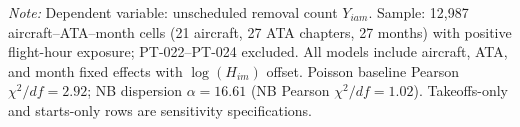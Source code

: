 \begin{table}[htbp]
\centering
\caption{Negative Binomial panel model incidence rate ratios for unscheduled removal demand (R-3).}
\label{tab:r3-nb-panel}
\small
\setlength{\tabcolsep}{4pt}
\par\smallskip
{\footnotesize \textit{Note:} Dependent variable: unscheduled removal count $Y_{iam}$. Sample: 12,987 aircraft--ATA--month cells (21 aircraft, 27 ATA chapters, 27 months) with positive flight-hour exposure; PT-022--PT-024 excluded. All models include aircraft, ATA, and month fixed effects with $\log(H_{im})$ offset. Poisson baseline Pearson $\chi^2/df = 2.92$; NB dispersion $\alpha = 16.61$ (NB Pearson $\chi^2/df = 1.02$). Takeoffs-only and starts-only rows are sensitivity specifications.}
\end{table}

